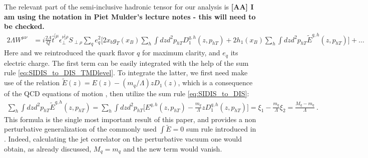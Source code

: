 \documentclass[preprintnumbers,floatfix,nofootinbib]{revtex4}
\newcommand{\todo}[1]{\marginpar{$\bullet$}\textbf{#1}}
\newcommand{\mj}{M_q}
\newcommand{\mq}{m_q}
\begin{document}
The relevant part of the semi-inclusive hadronic tensor for our analysis is 
\todo{[AA] I am using the notation in Piet Mulder's lecture notes - this will need to be checked.}
\begin{align}
  \label{eq:Wsidis_ini}
  2 \Lambda  W^{\mu\nu}
    & = i \frac{2\Lambda}{Q} \hat t^{[\mu}_{\phantom \perp} 
    \epsilon_\perp^{\nu]\rho}S_{\perp\rho} 
    \sum_q e_q^2
    \bigg[ 2 x_b g_T(x_B) \sum_h \int dz d^2p_{hT} D_1^{q,h}(z,p_{hT}) 
  + 2 h_1(x_B) \sum_h \int dz d^2p_{hT} \tilde E^{q,h}(z,p_{hT}) \bigg] + \ldots
\end{align}
Here and we reintroduced the quark flavor $q$ for maximum clarity, and $e_q$ its electric charge.
The first term can be easily integrated with the help of the sum rule \eqref{eq:SIDIS_to_DIS_TMDlevel}. To integrate the latter, we first need make use of the relation $\tilde E(z) = E(z) - (\mq/\Lambda) z D_1(z)$, which is a consequence of the QCD equations of motion \cite{New-testament}, then utilize the sum rule \eqref{eq:SIDIS_to_DIS}:
\begin{align}
  \sum_h \int dz d^2p_{hT} \tilde E^{q,h}(z,p_{hT}) 
    = \sum_h \int dz d^2p_{hT} \Big[ E^{q,h}(z,p_{hT}) - \frac{\mq}{\Lambda} z D_1^{q,h}(z,p_{hT}) \Big]
    = \xi_1 - \frac{\mq}{\Lambda} \xi_2 = \frac{\mj - \mq}{\Lambda} \ .
\end{align}
This formula is the single most important result of this paper, and provides a non perturbative generalization of the commonly used $\int\tilde E =0$ sum rule introduced in \cite{Jaffe-Ji}. Indeed, calculating the jet correlator
on the perturbative vacuum one would obtain, as already discussed, $\mj=\mq$
and the new term would vanish.
\end{document}
